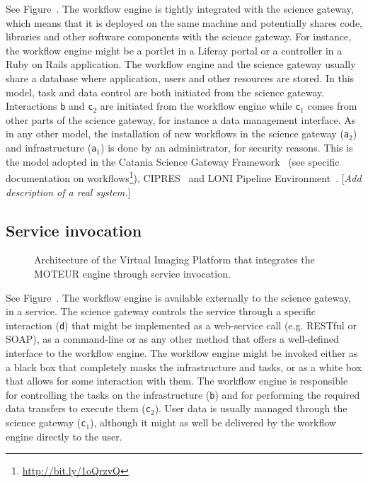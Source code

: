 \documentclass[preprint,3p,twocolumn]{elsarticle}
\newcommand{\todo}[1]{\color{blue}\xspace[\emph{#1}]\xspace\color{black}}
\begin{document}
See Figure~. The workflow engine is tightly
integrated with the science gateway, which means that it is deployed
on the same machine and potentially shares code, libraries and other
software components with the science gateway. For instance, the
workflow engine might be a portlet in a Liferay portal or a controller
in a Ruby on Rails application. The workflow engine and the science
gateway usually share a database where application, users and other
resources are stored. In this model, task and data control are both
initiated from the science gateway. Interactions \texttt{b} and
\texttt{c$_2$} are initiated from the workflow engine while
\texttt{c$_1$} comes from other parts of the science gateway, for
instance a data management interface. As in any other model, the
installation of new workflows in the science gateway (\texttt{a$_2$})
and infrastructure (\texttt{a$_1$}) is done by an administrator, for
security reasons. This is the model adopted in the Catania Science
Gateway Framework~\cite{Ardizzone2012} (see specific documentation on
workflows\footnote{\url{http://bit.ly/1oQrzvQ}}),
CIPRES~\cite{miller2010creating} and LONI Pipeline
Environment~\cite{dinov2009efficient}.
\todo{Add description of a real system.}


\subsection{Service invocation}

\begin{figure}
\centering
\def\svgwidth{1.5\columnwidth}

\caption{Architecture of the Virtual Imaging Platform that integrates
  the MOTEUR engine through service invocation.}
\label{fig:vip-architecture}
\end{figure}

See Figure~. The workflow engine is available
externally to the science gateway, in a service. The science gateway
controls the service through a specific interaction (\texttt{d}) that
might be implemented as a web-service call (e.g. RESTful or SOAP), as
a command-line or as any other method that offers a well-defined
interface to the workflow engine. The workflow engine might be invoked
either as a black box that completely masks the infrastructure and
tasks, or as a white box that allows for some interaction with
them. The workflow engine is responsible for controlling the tasks on
the infrastructure (\texttt{b}) and for performing the required data
transfers to execute them (\texttt{c$_2$}). User data is usually
managed through the science gateway (\texttt{c$_1$}), although it
might as well be delivered by the workflow engine directly to the
user.
\end{document}
